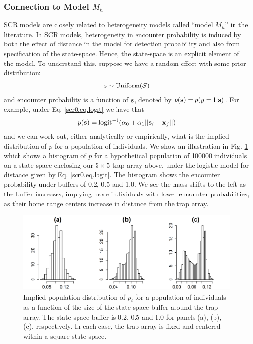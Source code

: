 \subsubsection{Connection to Model  $M_h$}  \label{scr0.sec.scrmh}

SCR models are closely related to heterogeneity models called ``model
$M_h$'' in the literature. In SCR models,
heterogeneity in encounter probability is induced by both the effect
of distance in the model for detection probability and also from
specification of the state-space. Hence, the state-space  is an
explicit element of the model. 
To understand this, suppose we have a random
effect with some prior distribution:
\[
{\bf s} \sim \mbox{Uniform}({\cal S})
\]
and encounter probability is a function of ${\bf s}$, denoted by 
 $p({\bf s}) = p(y=1|{\bf s})$. 
For example, under Eq. \ref{scr0.eq.logit}
we have that 
\[
p({\bf s}) = \mbox{logit}^{-1} ( \alpha_{0} + \alpha_1 ||{\bf
  s}_{i}-{\bf x}_{j} || )
\]
and we can work out, either analytically or empirically, what is the
implied distribution of $p$ for a population of individuals.  We show
an illustration in Fig. \ref{scr0.fig.buffereffect} which shows a
histogram of $p$ for a hypothetical population of 100000 individuals
on a state-space enclosing our $5 \times 5$ trap array above, under
the logistic model for distance given by Eq. \ref{scr0.eq.logit}. 
The
histogram shows the encounter probability under buffers of 0.2, 0.5
and 1.0. We see the mass shifts to the left as the buffer increases,
implying more individuals with lower encounter probabilities, as their
home range centers increase in distance from the trap array.


\begin{figure}[ht]
\begin{center}
\includegraphics[width=4.5in,height=1.6in]{Ch4-SCR0/figs/Mh_buffer}
\end{center}
\caption{Implied population distribution of $p_{i}$ for a population
  of individuals as a function of the size of the state-space buffer
around the trap array. The state-space buffer is 0.2, 0.5 and 1.0 for
panels (a), (b), (c), respectively.
In each case, the trap array is fixed and centered within a
  square state-space.
}
\label{scr0.fig.buffereffect}
\end{figure}

